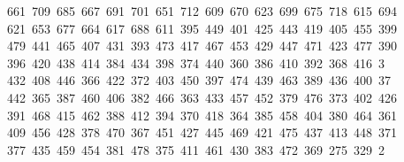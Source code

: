 \begin{tabbing}
\ 661\ 709\ 685\ 667\ 691\ 701\ 651\ 712\ 609\ 670\ 623\ 699\ 675\ 718\ 615\ 694\\[0pt]
\>\ 621\ 653\ 677\ 664\ 617\ 688\ 611\ 395\ 449\ 401\ 425\ 443\ 419\ 405\ 455\ 399\\[0pt]
\>\ 479\ 441\ 465\ 407\ 431\ 393\ 473\ 417\ 467\ 453\ 429\ 447\ 471\ 423\ 477\ 390\ \\[0pt]
\ 396\ 420\ 438\ 414\ 384\ 434\ 398\ 374\ 440\ 360\ 386\ 410\ 392\ 368\ 416\ 3\\[0pt]
\ 432\ 408\ 446\ 366\ 422\ 372\ 403\ 450\ 397\ 474\ 439\ 463\ 389\ 436\ 400\ 37\\[0pt]
\ 442\ 365\ 387\ 460\ 406\ 382\ 466\ 363\ 433\ 457\ 452\ 379\ 476\ 373\ 402\ 426\\[0pt]
\>\ 391\ 468\ 415\ 462\ 388\ 412\ 394\ 370\ 418\ 364\ 385\ 458\ 404\ 380\ 464\ 361\\[0pt]
\>\ 409\ 456\ 428\ 378\ 470\ 367\ 451\ 427\ 445\ 469\ 421\ 475\ 437\ 413\ 448\ 371\ \\[0pt]
\ 377\ 435\ 459\ 454\ 381\ 478\ 375\ 411\ 461\ 430\ 383\ 472\ 369\ 275\ 329\ 2\\[0pt]

\end{tabbing}
